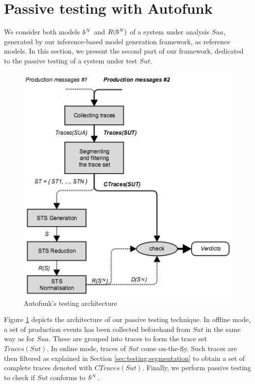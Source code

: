 
\section{Passive testing with Autofunk}
\label{sec:testing:passive}

We consider both models $\EuScript{S}^{N}$ and
$R(\EuScript{S}^{N})$ of a system under analysis $\mathit{Sua}$,
generated by our inference-based model generation framework, as
reference models. In this section, we present the second part of
our framework, dedicated to the passive testing of a system under
test $\mathit{Sut}$.

\begin{figure}[ht]
\includegraphics[width=0.85\linewidth]{figures/passive_autofunk.png}

\caption{Autofunk's testing architecture}
\label{fig:passive-autofunk}
\end{figure}

Figure \ref{fig:passive-autofunk} depicts the architecture of our
passive testing technique. In offline mode, a set of production
events has been collected beforehand from $\mathit{Sut}$ in the
same way as for $\mathit{Sua}$. These are grouped into traces to
form the trace set $Traces({Sut})$. In online mode, traces of
$\mathit{Sut}$ come on-the-fly. Such traces are then filtered as
explained in Section \ref{sec:testing:segmentation} to obtain a
set of complete traces denoted with $CTraces({Sut})$. Finally, we
perform passive testing to check if $\mathit{Sut}$ conforms to
$\EuScript{S}^{N}$.

